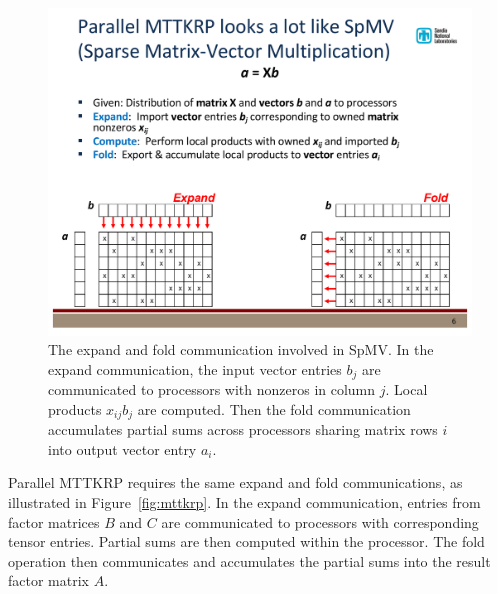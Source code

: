 \begin{figure}[ht]
   \centering
   \includegraphics[keepaspectratio=true, width=6.5in]{figs/spmv}
   \caption[The expand and fold communication involved in SpMV]{The expand and fold communication involved in SpMV.  In the expand communication, the input vector entries $b_j$ are communicated to processors with nonzeros in column $j$.
Local products $x_{ij} b_j$ are computed. Then the fold communication 
accumulates partial sums across processors sharing matrix rows $i$ into output
vector entry $a_i$.}
   \label{fig:spmv}
\end{figure}

Parallel MTTKRP requires the same expand and fold communications, as 
illustrated in Figure~\ref{fig:mttkrp}.  In the expand communication,
entries from
factor matrices $B$ and $C$ are communicated to processors with 
corresponding tensor entries.  
Partial sums are then computed within the processor.  
The fold operation then communicates and accumulates
the partial sums into the result factor matrix $A$.

